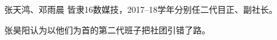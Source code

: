 \begin{section}{张天鸿、邓雨晨}
	\label{person:张天鸿、邓雨晨}
	皆隶16数媒技，2017--18学年分别任二代目正、副社长。

	张昊阳认为以他们为首的第二代班子把社团引错了路。
\end{section}